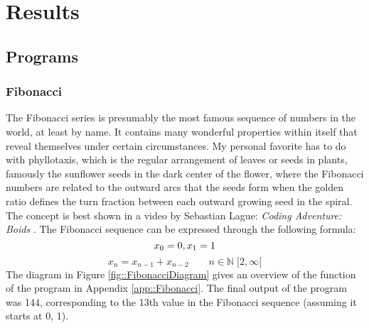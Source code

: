\chapter{Results}

\label{Chapter3}

\section{Programs}

\subsection{Fibonacci}
The Fibonacci series is presumably the most famous sequence of numbers in the world, at least by name. It contains many wonderful properties within itself that reveal themselves under certain circumstances. My personal favorite has to do with phyllotaxis, which is the regular arrangement of leaves or seeds in plants, famously the sunflower seeds in the dark center of the flower, where the Fibonacci numbers are related to the outward arcs that the seeds form when the golden ratio defines the turn fraction between each outward growing seed in the spiral. The concept is best shown in a video by Sebastian Lague: \textit{Coding Adventure: Boids} \cite[Timestamp: 03:03-06:12]{FibonacciSpiral}. The Fibonacci sequence can be expressed through the following formula:
    \[x_0 = 0,\space x_1 = 1\]
    \[x_n = x_{n-1} + x_{n-2} \qquad n \in \mathbb{N} \; [2,\infty[\]
The diagram in Figure \ref{fig::FibonacciDiagram} gives an overview of the function of the program in Appendix \ref{app::Fibonacci}. The final output of the program was 144, corresponding to the 13th value in the Fibonacci sequence (assuming it starts at 0, 1).


